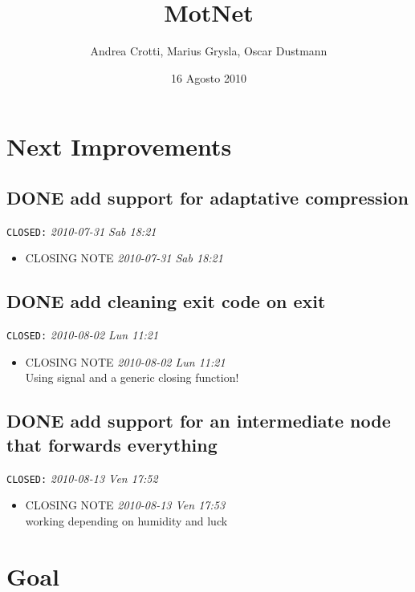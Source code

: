 \documentclass[11pt]{article}
\title{MotNet}
\author{Andrea Crotti, Marius Grysla, Oscar Dustmann}
\date{16 Agosto 2010}
\begin{document}
\maketitle

\setcounter{tocdepth}{3}
\tableofcontents
\vspace*{1cm}

\section{Next Improvements}
\label{sec-1}
\subsection{\textbf{DONE} add support for adaptative compression}
\label{sec-1_1}

   \texttt{CLOSED:} \textit{2010-07-31 Sab 18:21}

\begin{itemize}
\item CLOSING NOTE \textit{2010-07-31 Sab 18:21}
\end{itemize}
\subsection{\textbf{DONE} add cleaning exit code on exit}
\label{sec-1_2}

   \texttt{CLOSED:} \textit{2010-08-02 Lun 11:21}

\begin{itemize}
\item CLOSING NOTE \textit{2010-08-02 Lun 11:21} \\
Using signal and a generic closing function!
\end{itemize}

     
\subsection{\textbf{DONE} add support for an intermediate node that forwards everything}
\label{sec-1_3}

   \texttt{CLOSED:} \textit{2010-08-13 Ven 17:52}

\begin{itemize}
\item CLOSING NOTE \textit{2010-08-13 Ven 17:53} \\
working depending on humidity and luck
\end{itemize}
\section{Goal}
\label{sec-2}
\end{document}
